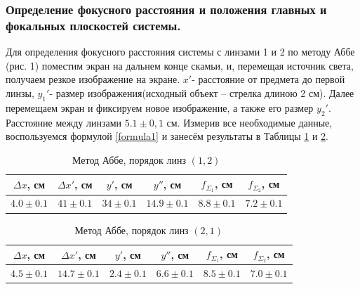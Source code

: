 \documentclass[a4paper,12pt]{article}
\begin{document}
\subsubsection*{Определение фокусного расстояния и положения главных и фокальных плоскостей системы.}
Для определения фокусного расстояния системы с линзами 1 и 2 по методу Аббе (рис. 1) поместим экран на дальнем конце скамьи, и, перемещая источник света, получаем резкое изображение на экране. $x'$- расстояние от предмета до первой линзы, $y_1'$- размер изображения(исходный объект -- стрелка длиною 2 см). Далее перемещаем экран и фиксируем новое изображение, а также его размер $y_2'$. Расстояние между линзами $ 5.1\pm0,1$ см.
Измерив все необходимые данные, воспользуемся формулой \eqref{formula1} и занесём результаты в Таблицы \ref{tab:5} и \ref{tab:6}.
\begin{table}[bhtp!]
	\centering
	\begin{tabular}{|c|c|c|c|c|c|}\hline
		$\Delta x$, см&   $\Delta x'$, см &  $y'$, см& $y''$, см & $f_{\Sigma_1}$, см & $f_{\Sigma_2}$, см \\\hline
		$4.0\pm 0.1$& $41 \pm 0.1$ & $34\pm0.1$& $14.9\pm 0.1$& $8.8 \pm0.1$ & $7.2\pm 0.1$  \\ \hline
	\end{tabular}
	\caption{Метод Аббе, порядок линз $(1,2)$}
	\label{tab:5}
\end{table}



\begin{table}[bhtp!]
	\centering
	\begin{tabular}{|c|c|c|c|c|c|}\hline
		$\Delta x$, см&   $\Delta x'$, см &  $y'$, см& $y''$, см & $f_{\Sigma_1}$, см & $f_{\Sigma_2}$, см \\\hline
		$4.5\pm 0.1$& $14.7 \pm 0.1$ & $2.4\pm0.1$& $6.6\pm 0.1$& $8.5 \pm0.1$ & $7.0\pm 0.1$  \\ \hline
	\end{tabular}
	\caption{Метод Аббе, порядок линз $(2,1)$}
	\label{tab:6}
\end{table}
\end{document}
